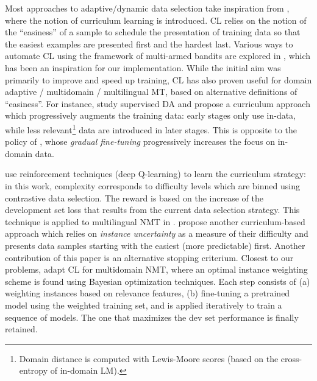 \documentclass[11pt]{article}
\newcommand{\fyDone}[1]{\done[FY]\Todo[FY:]{\textcolor{orange}{#1}}}
\begin{document}
Most approaches to adaptive/dynamic data selection take inspiration from , where the notion of curriculum learning is introduced. CL relies on the notion of the ``easiness'' of a sample to schedule the presentation of training data so that the easiest examples are presented first and the hardest last. Various ways to automate CL using the framework of multi-armed bandits are explored in \cite{Graves17automated}, which has been an inspiration for our implementation. While the initial aim was primarily to improve and speed up training, CL has also proven useful for domain adaptive / multidomain / multilingual MT, based on alternative definitions of ``easiness''.\fyDone{Ajouter Grave}
For instance,  study supervised DA and propose a curriculum approach which progressively augments the training data: early stages only use in-data, while less relevant\footnote{Domain distance is computed with Lewis-Moore scores (based on the cross-entropy of in-domain LM).} data are introduced in later stages. This is opposite to the policy of , whose \emph{gradual fine-tuning} progressively increases the focus on in-domain data.\fyDone{These have not been compared? and also to what we do ?} 

 use reinforcement techniques (deep Q-learning) to learn the curriculum strategy: in this work, complexity corresponds to difficulty levels which are binned using contrastive data selection. The reward is based on the increase of the development set loss that results from the current data selection strategy.\fyDone{Alert: what do we do during warm-up ?} This technique is applied to multilingual NMT in \cite{Kumar21learning}.  propose another curriculum-based approach which relies on \emph{instance uncertainty} as a measure of their difficulty and presents data samples starting with the easiest (more predictable) first. Another contribution of this paper is an alternative stopping criterium. Closest to our problems,  adapt CL for multidomain NMT, where an optimal instance weighting scheme is found using Bayesian optimization techniques. Each step consists of (a) weighting instances based on relevance features, (b) fine-tuning a pretrained model using the weighted training set, and is applied iteratively to train a sequence of models. The one that maximizes the dev set performance is finally retained.
\end{document}
